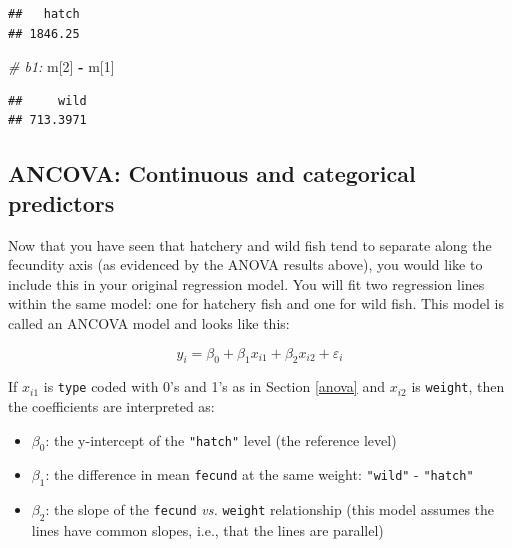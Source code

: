 \documentclass[]{book}
\newenvironment{Shaded}{\begin{snugshade}}{\end{snugshade}}
\newcommand{\KeywordTok}[1]{\textcolor[rgb]{0.13,0.29,0.53}{\textbf{#1}}}
\newcommand{\DataTypeTok}[1]{\textcolor[rgb]{0.13,0.29,0.53}{#1}}
\newcommand{\DecValTok}[1]{\textcolor[rgb]{0.00,0.00,0.81}{#1}}
\newcommand{\StringTok}[1]{\textcolor[rgb]{0.31,0.60,0.02}{#1}}
\newcommand{\CommentTok}[1]{\textcolor[rgb]{0.56,0.35,0.01}{\textit{#1}}}
\newcommand{\OperatorTok}[1]{\textcolor[rgb]{0.81,0.36,0.00}{\textbf{#1}}}
\newcommand{\NormalTok}[1]{#1}
\providecommand{\tightlist}{%
  \setlength{\itemsep}{0pt}\setlength{\parskip}{0pt}}
\theoremstyle{definition}
\theoremstyle{definition}
\theoremstyle{definition}
\theoremstyle{remark}
\begin{document}
\begin{Shaded}
\end{Shaded}

\begin{verbatim}
##   hatch 
## 1846.25
\end{verbatim}

\begin{Shaded}
\begin{Highlighting}[]
\CommentTok{# b1:}
\NormalTok{m[}\DecValTok{2}\NormalTok{] }\OperatorTok{-}\StringTok{ }\NormalTok{m[}\DecValTok{1}\NormalTok{]}
\end{Highlighting}
\end{Shaded}

\begin{verbatim}
##     wild 
## 713.3971
\end{verbatim}

\subsection{ANCOVA: Continuous and categorical
predictors}\label{ancova-continuous-and-categorical-predictors}

Now that you have seen that hatchery and wild fish tend to separate
along the fecundity axis (as evidenced by the ANOVA results above), you
would like to include this in your original regression model. You will
fit two regression lines within the same model: one for hatchery fish
and one for wild fish. This model is called an ANCOVA model and looks
like this:

\begin{equation}
  y_i=\beta_0 + \beta_1 x_{i1} + \beta_2 x_{i2} + \varepsilon_i
\label{eq:ancova}
\end{equation}

If \(x_{i1}\) is \texttt{type} coded with 0's and 1's as in Section
\ref{anova} and \(x_{i2}\) is \texttt{weight}, then the coefficients are
interpreted as:

\begin{itemize}
\tightlist
\item
  \(\beta_0\): the y-intercept of the \texttt{"hatch"} level (the
  reference level)
\item
  \(\beta_1\): the difference in mean \texttt{fecund} at the same
  weight: \texttt{"wild"} - \texttt{"hatch"}
\item
  \(\beta_2\): the slope of the \texttt{fecund} \emph{vs.}
  \texttt{weight} relationship (this model assumes the lines have common
  slopes, i.e., that the lines are parallel)
\end{itemize}
\end{document}
